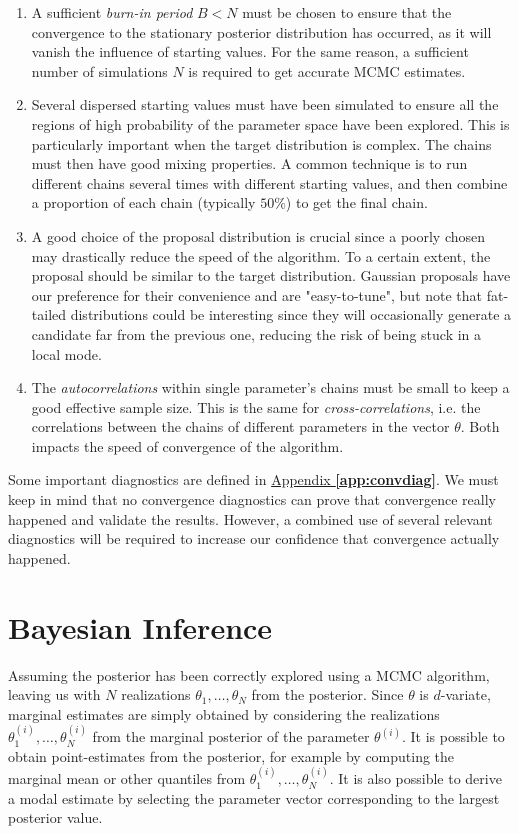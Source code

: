 \begin{enumerate}
	\item A sufficient \emph{burn-in period} $B<N$ must be chosen to ensure that the convergence to the stationary posterior distribution has occurred, as it will vanish the influence of starting values. For the same reason, a sufficient number of simulations $N$ is required to get accurate MCMC estimates.
	\item Several dispersed starting values must have been simulated to ensure all the regions of high probability of the parameter space have been explored. This is particularly important when the target distribution is complex. The chains must then have good mixing properties. A common technique is to run different chains several times with different starting values, and then combine a proportion of each chain (typically $50\%$) to get the final chain. %
	\item A good choice of the proposal distribution is crucial since a poorly chosen may drastically reduce the speed of the algorithm. To a certain extent, the proposal should be similar to the target distribution. Gaussian proposals have our preference for their convenience and are "easy-to-tune", but note that fat-tailed distributions could be interesting since they will occasionally generate a candidate far from the previous one, reducing the risk of being stuck in a local mode.
	\item The \emph{autocorrelations} within single parameter's chains must be small to keep a good effective sample size.
    This is the same for \emph{cross-correlations}, i.e. the correlations between the chains of different parameters in the vector $\theta$.  Both impacts the speed of convergence of the algorithm.
\end{enumerate}
Some important diagnostics are defined in \hyperref[app:convdiag]{Appendix \textbf{\ref{app:convdiag}}}. We must keep in mind that no convergence diagnostics can prove that convergence really happened and validate the results.
However, a combined use of several relevant diagnostics will be required to increase our confidence that convergence actually happened.



\section{Bayesian Inference}\label{sec:bayinf}

Assuming the posterior has been correctly explored using a MCMC algorithm, leaving us with $N$ realizations $\theta_1,\ldots,\theta_N$ from the posterior. Since $\theta$ is $d$-variate, marginal estimates are simply obtained by considering the realizations $\theta_1^{(i)},\ldots,\theta_N^{(i)}$  from the marginal posterior of the parameter $\theta^{(i)}$. It is possible to obtain point-estimates from the posterior, for example by computing the marginal mean or other quantiles from  $\theta_1^{(i)},\ldots,\theta_N^{(i)}$. It is also possible to derive a modal estimate by selecting the parameter vector corresponding to the largest posterior value.

